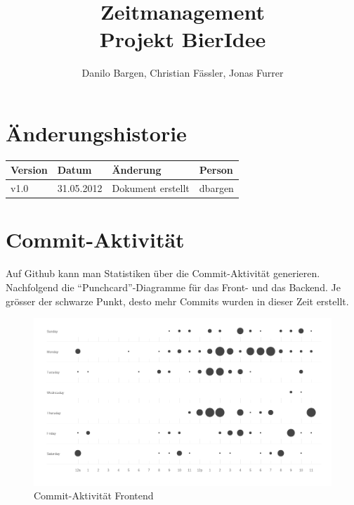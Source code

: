 \documentclass[10pt,a4paper]{scrartcl}
\author{Danilo Bargen, Christian Fässler, Jonas Furrer}
\title{Zeitmanagement\\ Projekt BierIdee}
\begin{document}
\begin{titlepage}
	\maketitle
	\vspace{120mm}
	\thispagestyle{empty} %
\end{titlepage}

\tableofcontents
\newpage

\section*{Änderungshistorie}
\begin{tabular}{p{}p{}p{}p{}}
\toprule
\textbf{Version} & \textbf{Datum} & \textbf{Änderung} & \textbf{Person} \\  
\midrule
v1.0 & 31.05.2012 & Dokument erstellt & dbargen \\  
\bottomrule
\end{tabular} 
\newpage

\section{Commit-Aktivität}

Auf Github kann man Statistiken über die Commit-Aktivität generieren. Nachfolgend die
"`Punchcard"'-Diagramme für das Front- und das Backend. Je grösser der schwarze Punkt, desto mehr
Commits wurden in dieser Zeit erstellt.

\begin{figure}[H]
	\begin{center}
		\includegraphics[width=\textwidth]{img/punchcard_front.png}
	\end{center}
	\caption{Commit-Aktivität Frontend}
\end{figure}
\end{document}

